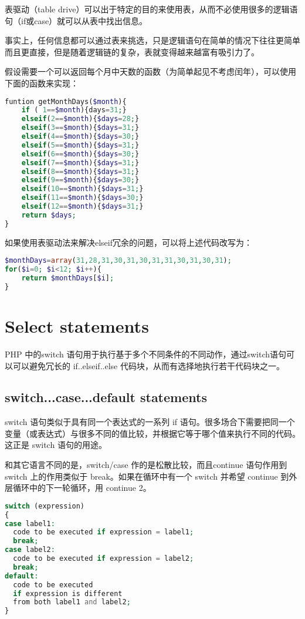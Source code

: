表驱动（table drive）可以出于特定的目的来使用表，从而不必使用很多的逻辑语句（if或case）就可以从表中找出信息。

事实上，任何信息都可以通过表来挑选，只是逻辑语句在简单的情况下往往更简单而且更直接，但是随着逻辑链的复杂，表就变得越来越富有吸引力了。

假设需要一个可以返回每个月中天数的函数（为简单起见不考虑闰年），可以使用下面的函数来实现：


\begin{lstlisting}[language=PHP]
funtion getMonthDays($month){
	if ( 1==$month){days=31;}
	elseif(2==$month){$days=28;}
	elseif(3==$month){$days=31;}
	elseif(4==$month){$days=30;}
	elseif(5==$month){$days=31;}
	elseif(6==$month){$days=30;}
	elseif(7==$month){$days=31;}
	elseif(8==$month){$days=31;}
	elseif(9==$month){$days=30;}
	elseif(10==$month){$days=31;}
	elseif(11==$month){$days=30;}
	elseif(12==$month){$days=31;}
	return $days;
}
\end{lstlisting}

如果使用表驱动法来解决elseif冗余的问题，可以将上述代码改写为：


\begin{lstlisting}[language=PHP]
$monthDays=array(31,28,31,30,31,30,31,31,30,31,30,31);
for($i=0; $i<12; $i++){
	return $monthDays[$i];
}
\end{lstlisting}

\section{Select statements}

PHP 中的switch 语句用于执行基于多个不同条件的不同动作，通过switch语句可以可以避免冗长的 if..elseif..else 代码块，从而有选择地执行若干代码块之一。


\subsection{switch...case...default statements}

switch 语句类似于具有同一个表达式的一系列 if 语句。很多场合下需要把同一个变量（或表达式）与很多不同的值比较，并根据它等于哪个值来执行不同的代码。这正是 switch 语句的用途。

和其它语言不同的是，switch/case 作的是松散比较，而且continue 语句作用到 switch 上的作用类似于 break。如果在循环中有一个 switch 并希望 continue 到外层循环中的下一轮循环，用 continue 2。

\begin{lstlisting}[language=PHP]
switch (expression)
{
case label1:
  code to be executed if expression = label1;
  break;  
case label2:
  code to be executed if expression = label2;
  break;
default:
  code to be executed
  if expression is different 
  from both label1 and label2;
}
\end{lstlisting}

